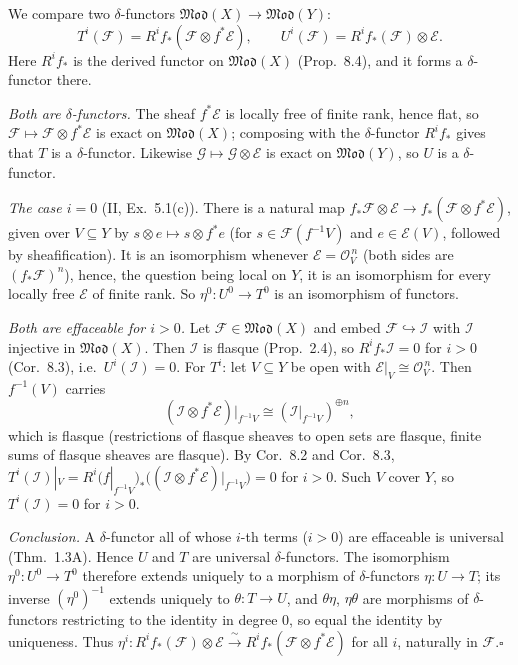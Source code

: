 \documentclass[11pt]{article}
\begin{document}
\pf
We compare two $\delta$-functors $\mathfrak{Mod}(X)\to\mathfrak{Mod}(Y)$:
\[
T^i(\mathcal F)=R^if_*(\mathcal F\otimes f^*\mathcal E),\qquad U^i(\mathcal F)=R^if_*(\mathcal F)\otimes\mathcal E .
\]
Here $R^if_*$ is the derived functor on $\mathfrak{Mod}(X)$ (Prop.~8.4), and it forms a $\delta$-functor there.

\emph{Both are $\delta$-functors.} The sheaf $f^*\mathcal E$ is locally free of finite rank, hence flat, so $\mathcal F\mapsto\mathcal F\otimes f^*\mathcal E$ is exact on $\mathfrak{Mod}(X)$; composing with the $\delta$-functor $R^if_*$ gives that $T$ is a $\delta$-functor. Likewise $\mathcal G\mapsto\mathcal G\otimes\mathcal E$ is exact on $\mathfrak{Mod}(Y)$, so $U$ is a $\delta$-functor.

\emph{The case $i=0$} (II, Ex.~5.1(c)). There is a natural map $f_*\mathcal F\otimes\mathcal E\to f_*(\mathcal F\otimes f^*\mathcal E)$, given over $V\subseteq Y$ by $s\otimes e\mapsto s\otimes f^{*}e$ (for $s\in\mathcal F(f^{-1}V)$ and $e\in\mathcal E(V)$, followed by sheafification). It is an isomorphism whenever $\mathcal E=\mathcal O_V^{\,n}$ (both sides are $(f_*\mathcal F)^{n}$), hence, the question being local on $Y$, it is an isomorphism for every locally free $\mathcal E$ of finite rank. So $\eta^0:U^0\to T^0$ is an isomorphism of functors.

\emph{Both are effaceable for $i>0$.} Let $\mathcal F\in\mathfrak{Mod}(X)$ and embed $\mathcal F\hookrightarrow\mathcal I$ with $\mathcal I$ injective in $\mathfrak{Mod}(X)$. Then $\mathcal I$ is flasque (Prop.~2.4), so $R^if_*\mathcal I=0$ for $i>0$ (Cor.~8.3), i.e.\ $U^i(\mathcal I)=0$. For $T^i$: let $V\subseteq Y$ be open with $\mathcal E|_V\cong\mathcal O_V^{\,n}$. Then $f^{-1}(V)$ carries
\[
(\mathcal I\otimes f^*\mathcal E)|_{f^{-1}V}\cong(\mathcal I|_{f^{-1}V})^{\oplus n},
\]
which is flasque (restrictions of flasque sheaves to open sets are flasque, finite sums of flasque sheaves are flasque). By Cor.~8.2 and Cor.~8.3, $T^i(\mathcal I)|_V=R^i(f|_{f^{-1}V})_*\bigl((\mathcal I\otimes f^*\mathcal E)|_{f^{-1}V}\bigr)=0$ for $i>0$. Such $V$ cover $Y$, so $T^i(\mathcal I)=0$ for $i>0$.

\emph{Conclusion.} A $\delta$-functor all of whose $i$-th terms ($i>0$) are effaceable is universal (Thm.~1.3A). Hence $U$ and $T$ are universal $\delta$-functors. The isomorphism $\eta^0:U^0\to T^0$ therefore extends uniquely to a morphism of $\delta$-functors $\eta:U\to T$; its inverse $(\eta^0)^{-1}$ extends uniquely to $\theta:T\to U$, and $\theta\eta$, $\eta\theta$ are morphisms of $\delta$-functors restricting to the identity in degree $0$, so equal the identity by uniqueness. Thus $\eta^i:R^if_*(\mathcal F)\otimes\mathcal E\xrightarrow{\ \sim\ }R^if_*(\mathcal F\otimes f^*\mathcal E)$ for all $i$, naturally in $\mathcal F$.\hfill$\square$
\end{document}
